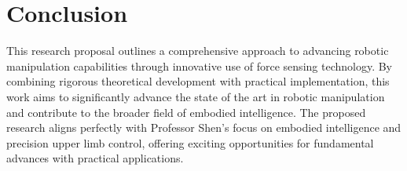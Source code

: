 \documentclass[11pt,a4paper]{article}
\begin{document}
\section{Conclusion}
This research proposal outlines a comprehensive approach to advancing robotic manipulation capabilities through innovative use of force sensing technology. By combining rigorous theoretical development with practical implementation, this work aims to significantly advance the state of the art in robotic manipulation and contribute to the broader field of embodied intelligence. The proposed research aligns perfectly with Professor Shen's focus on embodied intelligence and precision upper limb control, offering exciting opportunities for fundamental advances with practical applications.

\vspace{30pt}



\end{document}
